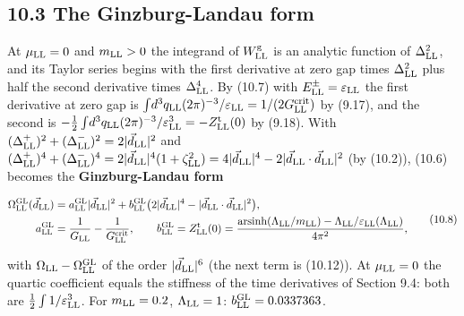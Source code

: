 \documentclass[
  10pt,
]{article}
\begin{document}
\hypertarget{the-ginzburg-landau-form}{%
\subsection{10.3 The Ginzburg-Landau
form}\label{the-ginzburg-landau-form}}

At \(\mu_{\rm LL}=0\) and \(m_{\rm LL}>0\) the integrand of
\(W^{\rm g}_{\rm LL}\) is an analytic function of \(\Delta_{\rm LL}^2\),
and its Taylor series begins with the first derivative at zero gap times
\(\Delta_{\rm LL}^2\) plus half the second derivative times
\(\Delta_{\rm LL}^4\). By (10.7) with
\(E^\pm_{\rm LL}=\varepsilon_{\rm LL}\) the first derivative at zero gap
is
\(\int\!d^3q_{\rm LL}(2\pi)^{-3}/\varepsilon_{\rm LL}=1/(2G^{\rm crit}_{\rm LL})\)
by (9.17), and the second is
\(-\tfrac12\int\!d^3q_{\rm LL}(2\pi)^{-3}/\varepsilon_{\rm LL}^3=-Z^{\rm t}_{\rm LL}(0)\)
by (9.18). With
\((\Delta^+_{\rm LL})^2+(\Delta^-_{\rm LL})^2=2\lvert\vec d_{\rm LL}\rvert^2\)
and
\((\Delta^+_{\rm LL})^4+(\Delta^-_{\rm LL})^4=2\lvert\vec d_{\rm LL}\rvert^4(1+\zeta_{\rm LL}^2)=4\lvert\vec d_{\rm LL}\rvert^4-2\lvert\vec d_{\rm LL}\cdot\vec d_{\rm LL}\rvert^2\)
(by (10.2)), (10.6) becomes the \textbf{Ginzburg-Landau form}

\[\begin{aligned}\Omega^{\rm GL}_{\rm LL}(\vec d_{\rm LL})&=a^{\rm GL}_{\rm LL}\lvert\vec d_{\rm LL}\rvert^2+b^{\rm GL}_{\rm LL}\big(2\lvert\vec d_{\rm LL}\rvert^4-\lvert\vec d_{\rm LL}\cdot\vec d_{\rm LL}\rvert^2\big),\\a^{\rm GL}_{\rm LL}&=\frac1{G_{\rm LL}}-\frac1{G^{\rm crit}_{\rm LL}},\qquad b^{\rm GL}_{\rm LL}=Z^{\rm t}_{\rm LL}(0)=\frac{\mathrm{arsinh}(\Lambda_{\rm LL}/m_{\rm LL})-\Lambda_{\rm LL}/\varepsilon_{\rm LL}(\Lambda_{\rm LL})}{4\pi^2},\end{aligned}\tag{10.8}\]

with \(\Omega_{\rm LL}-\Omega^{\rm GL}_{\rm LL}\) of the order
\(\lvert\vec d_{\rm LL}\rvert^6\) (the next term is (10.12)). At
\(\mu_{\rm LL}=0\) the quartic coefficient equals the stiffness of the
time derivatives of Section 9.4: both are
\(\tfrac12\int1/\varepsilon_{\rm LL}^3\). For \(m_{\rm LL}=0.2\),
\(\Lambda_{\rm LL}=1\): \(b^{\rm GL}_{\rm LL}=0.0337363\).
\end{document}
